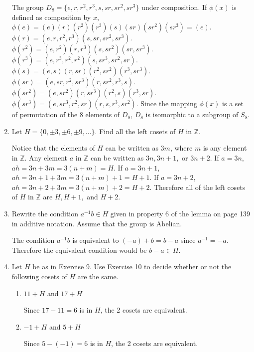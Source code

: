 \documentclass{article}
\newcommand{\Z}{\mathbb Z}
\begin{document}
\begin{enumerate}
\begin{flushleft}
    The group $D_8 = \{ e, r, r^2, r^3, s, sr, sr^2, sr^3 \}$ under composition. If $\phi(x)$ is defined as composition by $x$, $\phi(e) = (e)(r)(r^2)(r^3)(s)(sr)(sr^2)(sr^3) = (e)$. $\phi(r) = (e, r, r^2, r^3)(s, sr, sr^2, sr^3)$. $\phi(r^2) = (e, r^2)(r, r^3)(s, sr^2)(sr, sr^3)$. $\phi(r^3) = (e, r^3, r^2, r^2)(s, sr^3, sr^2, sr)$. $\phi(s) = (e, s)(r, sr)(r^2, sr^2)(r^3, sr^3)$. $\phi(sr) = (e, sr, r^2, sr^3)(r, sr^2, r^3, s)$. $\phi(sr^2) = (e, sr^2)(r, sr^3)(r^2, s)(r^3, sr)$. $\phi(sr^3) = (e, sr^3, r^2, sr)(r, s, r^3, sr^2)$. Since the mapping $\phi(x)$ is a set of permutation of the 8 elements of $D_8$, $D_8$ is isomorphic to a subgroup of $S_8$.
    \end{flushleft}
    \item Let $H = \{ 0 , \pm 3 , \pm 6 , \pm 9 , \ldots \} .$ Find all the left cosets of $H$ in $\Z$.
    \begin{flushleft}
    Notice that the elements of $H$ can be written as $3m$, where $m$ is any element in $\Z$. Any element $a$ in $\Z$ can be written as $3n, 3n+1,$ or $3n+2$. If $a = 3n$, $ah = 3n + 3m = 3(n+m) = H$. If $a = 3n + 1$, $ah = 3n + 1 + 3m = 3(n+m) + 1 = H + 1$. If $a = 3n + 2$, $ah = 3n + 2 + 3m = 3(n+m) + 2 = H + 2$. Therefore all of the left cosets of $H$ in $\Z$ are $H, H + 1,$ and $H+2$.
    \end{flushleft}
    \item Rewrite the condition $a^{-1}b \in H$ given in property 6 of the lemma on page 139 in additive notation. Assume that the group is Abelian.
    \begin{flushleft}
    The condition $a^{-1}b$ is equivalent to $(-a) + b = b -a$ since $a^{-1} = -a$. Therefore the equivalent condition would be $b - a \in H$.
    \end{flushleft}
    \item Let $H$ be as in Exercise 9. Use Exercise 10 to decide whether or not the following cosets of $H$ are the same.
    \begin{enumerate}
        \item $11 + H$ and $17 + H$
        \begin{flushleft}
        Since $17 - 11 = 6$ is in $H$, the 2 cosets are equivalent.
        \end{flushleft}
        \item $- 1 + H$ and $5 + H$
        \begin{flushleft}
         Since $5 - (-1) = 6$ is in $H$, the 2 cosets are equivalent.
        \end{flushleft}

\end{enumerate}
\end{enumerate}
\end{document}

